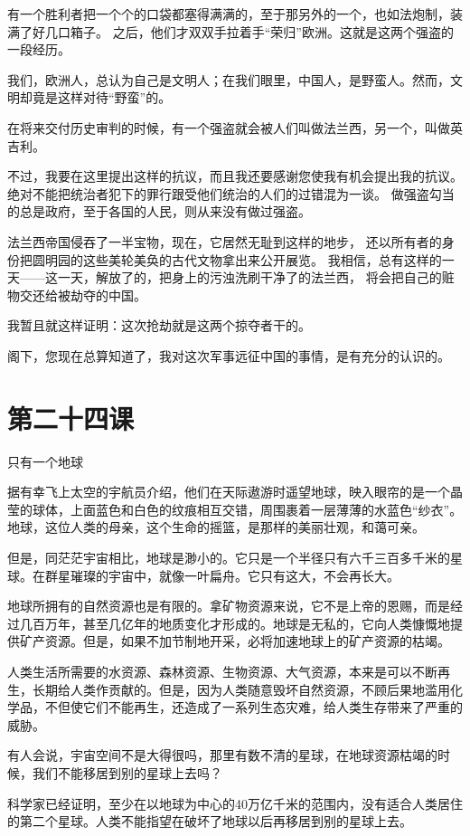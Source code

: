 \documentclass[12pt,UTF8]{ctexbook}
\begin{document}
有一个胜利者把一个个的口袋都塞得满满的，至于那另外的一个，也如法炮制，装满了好几口箱子。
之后，他们才双双手拉着手“荣归”欧洲。这就是这两个强盗的一段经历。

我们，欧洲人，总认为自己是文明人；在我们眼里，中国人，是野蛮人。然而，文明却竟是这样对待“野蛮”的。

在将来交付历史审判的时候，有一个强盗就会被人们叫做法兰西，另一个，叫做英吉利。

不过，我要在这里提出这样的抗议，而且我还要感谢您使我有机会提出我的抗议。
绝对不能把统治者犯下的罪行跟受他们统治的人们的过错混为一谈。
做强盗勾当的总是政府，至于各国的人民，则从来没有做过强盗。

法兰西帝国侵吞了一半宝物，现在，它居然无耻到这样的地步，
还以所有者的身份把圆明园的这些美轮美奂的古代文物拿出来公开展览。
我相信，总有这样的一天——这一天，解放了的，把身上的污浊洗刷干净了的法兰西，
将会把自己的赃物交还给被劫夺的中国。

我暂且就这样证明：这次抢劫就是这两个掠夺者干的。

阁下，您现在总算知道了，我对这次军事远征中国的事情，是有充分的认识的。

\section{第二十四课}

只有一个地球

据有幸飞上太空的宇航员介绍，他们在天际遨游时遥望地球，映入眼帘的是一个晶莹的球体，上面蓝色和白色的纹痕相互交错，周围裹着一层薄薄的水蓝色“纱衣”。地球，这位人类的母亲，这个生命的摇篮，是那样的美丽壮观，和蔼可亲。

但是，同茫茫宇宙相比，地球是渺小的。它只是一个半径只有六千三百多千米的星球。在群星璀璨的宇宙中，就像一叶扁舟。它只有这大，不会再长大。

地球所拥有的自然资源也是有限的。拿矿物资源来说，它不是上帝的恩赐，而是经过几百万年，甚至几亿年的地质变化才形成的。地球是无私的，它向人类慷慨地提供矿产资源。但是，如果不加节制地开采，必将加速地球上的矿产资源的枯竭。

人类生活所需要的水资源、森林资源、生物资源、大气资源，本来是可以不断再生，长期给人类作贡献的。但是，因为人类随意毁坏自然资源，不顾后果地滥用化学品，不但使它们不能再生，还造成了一系列生态灾难，给人类生存带来了严重的威胁。

有人会说，宇宙空间不是大得很吗，那里有数不清的星球，在地球资源枯竭的时候，我们不能移居到别的星球上去吗？

科学家已经证明，至少在以地球为中心的40万亿千米的范围内，没有适合人类居住的第二个星球。人类不能指望在破坏了地球以后再移居到别的星球上去。
\end{document}
